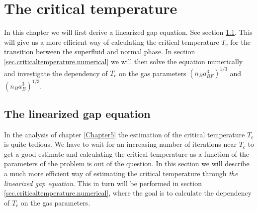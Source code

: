 
\chapter{The critical temperature} %

\label{Chapter6} %


In this chapter we will first derive a linearized gap equation. See section \ref{sec.linearizedgapequation}. This will give us a more efficient way of calculating the critical temperature $T_c$ for the transition between the superfluid and normal phase. In section \ref{sec.criticaltemperature.numerical} we will then solve the equation numerically and investigate the dependency of $T_c$ on the gas parameters $(n_Ba_{BF}^3)^{1/3}$ and $(n_Ba_B^3)^{1/3}$. 

\section{The linearized gap equation} \label{sec.linearizedgapequation}
In the analysis of chapter \ref{Chapter5} the estimation of the critical temperature $T_c$ is quite tedious. We have to wait for an increasing number of iterations near $T_c$ to get a good estimate and calculating the critical temperature as a function of the parameters of the problem is out of the question. In this section we will describe a much more efficient way of estimating the critical temperature through \textit{the linearized gap equation}. This in turn will be performed in section \ref{sec.criticaltemperature.numerical}, where the goal is to calculate the dependency of $T_c$ on the gas parameters.

